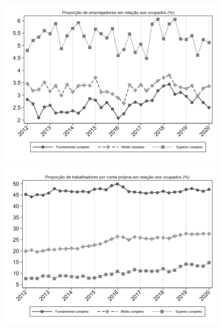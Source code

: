 \begin{frame}[label=_composicao_demografica_educacao_prop_empregador]{}
\textit{\hyperlink{_composicao_demografica_educacao}{}}
\begin{figure}
  \centering
  \includegraphics[width=1.0\linewidth]{../../analysis/output/composicao_demografica/educacao/_composicao_demografica_educacao_prop_empregador.png}
  \caption{}
  \label{fig:_composicao_demografica_educacao_prop_empregador}
\end{figure}
\end{frame}



\begin{frame}[label=_composicao_demografica_educacao_prop_cpropria]{}
\textit{\hyperlink{_composicao_demografica_educacao}{}}
\begin{figure}
  \centering
  \includegraphics[width=1.0\linewidth]{../../analysis/output/composicao_demografica/educacao/_composicao_demografica_educacao_prop_cpropria.png}
  \caption{}
  \label{fig:_composicao_demografica_educacao_prop_cpropria}
\end{figure}
\end{frame}

